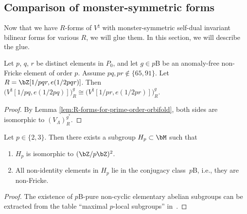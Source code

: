 \subsection{Comparison of monster-symmetric forms}

Now that we have $R$-forms of $V^\natural$ with monster-symmetric self-dual invariant bilinear forms for various $R$, we will glue them. In this section, we will describe the glue.

\begin{lem} \label{lem:fixed-point-comparison}Let $p$, $q$, $r$ be distinct elements in $P_0$, and let $g \in p$B be an anomaly-free non-Fricke element of order $p$. Assume $pq, pr \not\in \{65, 91\}$. Let $R = \bZ[1/pqr, e(1/2pqr)]$. Then $\big(V^\natural[1/pq,e(1/2pq)]\big)^g_R \cong \big(V^\natural[1/pr,e(1/2pr)]\big)^g_R$.
\end{lem}
\begin{proof}By Lemma \ref{lem:R-forms-for-prime-order-orbifold}, both sides are isomorphic to $(V_\Lambda)_R^{g^*}$.
\end{proof}

\begin{lem} \label{lem:affine-subgroups-of-monster}Let $p \in \{2,3\}$. Then there exists a subgroup $H_p \subset \bM$ such that
\begin{enumerate}\itemsep=0pt
\item[$1.$] $H_p$ is isomorphic to $(\bZ/p\bZ)^2$.
\item[$2.$] All non-identity elements in $H_p$ lie in the conjugacy class~$p$B, i.e., they are non-Fricke.
\end{enumerate}
\end{lem}
\begin{proof}The existence of $p$B-pure non-cyclic elementary abelian subgroups can be extracted from the table ``maximal $p$-local subgroups'' in~\cite{ATLAS}.
\end{proof}

